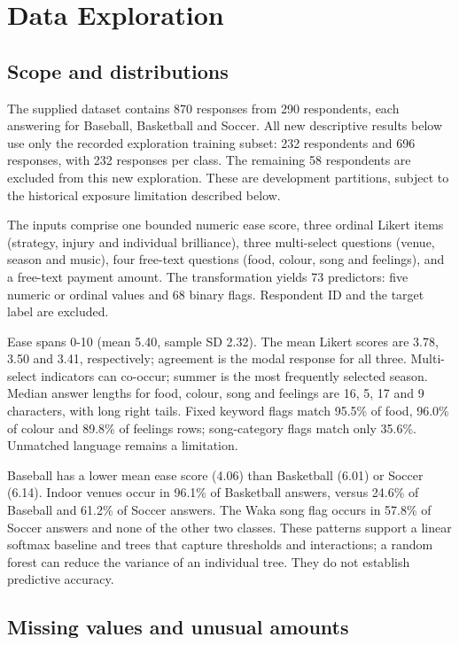 \section{Data Exploration}\label{sec:data-exploration}

\subsection{Scope and distributions}

The supplied dataset contains 870 responses from 290 respondents, each answering for Baseball, Basketball and Soccer. All new descriptive results below use only the recorded exploration training subset: 232 respondents and 696 responses, with 232 responses per class. The remaining 58 respondents are excluded from this new exploration. These are development partitions, subject to the historical exposure limitation described below.

The inputs comprise one bounded numeric ease score, three ordinal Likert items (strategy, injury and individual brilliance), three multi-select questions (venue, season and music), four free-text questions (food, colour, song and feelings), and a free-text payment amount. The transformation yields 73 predictors: five numeric or ordinal values and 68 binary flags. Respondent ID and the target label are excluded.

Ease spans 0-10 (mean 5.40, sample SD 2.32). The mean Likert scores are 3.78, 3.50 and 3.41, respectively; agreement is the modal response for all three. Multi-select indicators can co-occur; summer is the most frequently selected season. Median answer lengths for food, colour, song and feelings are 16, 5, 17 and 9 characters, with long right tails. Fixed keyword flags match 95.5\% of food, 96.0\% of colour and 89.8\% of feelings rows; song-category flags match only 35.6\%. Unmatched language remains a limitation.

Baseball has a lower mean ease score (4.06) than Basketball (6.01) or Soccer (6.14). Indoor venues occur in 96.1\% of Basketball answers, versus 24.6\% of Baseball and 61.2\% of Soccer answers. The Waka song flag occurs in 57.8\% of Soccer answers and none of the other two classes. These patterns support a linear softmax baseline and trees that capture thresholds and interactions; a random forest can reduce the variance of an individual tree. They do not establish predictive accuracy.

\subsection{Missing values and unusual amounts}


